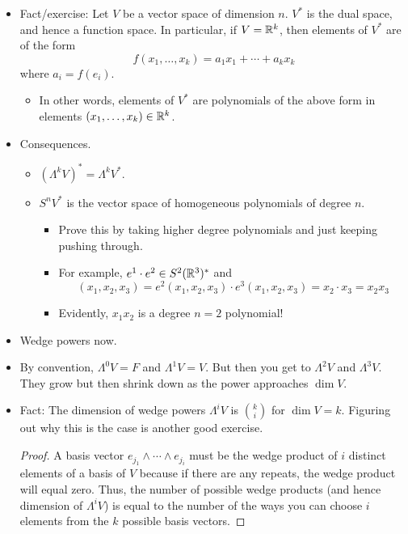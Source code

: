 \documentclass[../notes.tex]{subfiles}
\begin{document}
\begin{itemize}
\begin{itemize}
        \item Fact/exercise: Let $V$ be a vector space of dimension $n$. $V^*$ is the dual space, and hence a function space. In particular, if $V=\mathbb{R}^k$, then elements of $V^*$ are of the form
        \begin{equation*}
            f(x_1,\dots,x_k) = a_1x_1+\cdots+a_kx_k
        \end{equation*}
        where $a_i=f(e_i)$.
        \begin{itemize}
            \item In other words, elements of $V^*$ are polynomials of the above form in elements $(x_1,\dots,x_k)\in\mathbb{R}^k$.
        \end{itemize}
        \item Consequences.
        \begin{itemize}
            \item $(\Lambda^kV)^*=\Lambda^kV^*$.
            \item $S^nV^*$ is the vector space of homogeneous polynomials of degree $n$.
            \begin{itemize}
                \item Prove this by taking higher degree polynomials and just keeping pushing through.
                \item For example, $e^1\cdot e^2\in S^2(\mathbb{R}^3)^*$ and
                \begin{equation*}
                    [e^2\cdot e^3](x_1,x_2,x_3) = e^2(x_1,x_2,x_3)\cdot e^3(x_1,x_2,x_3) = x_2\cdot x_3 = x_2x_3
                \end{equation*}
                \item Evidently, $x_1x_2$ is a degree $n=2$ polynomial!
            \end{itemize}
        \end{itemize}
        \item Wedge powers now.
        \item By convention, $\Lambda^0V=F$ and $\Lambda^1V=V$. But then you get to $\Lambda^2V$ and $\Lambda^3V$. They grow but then shrink down as the power approaches $\dim V$.
        \item Fact: The dimension of wedge powers $\Lambda^iV$ is $\binom{k}{i}$ for $\dim V=k$. Figuring out why this is the case is another good exercise.
        \begin{proof}
            A basis vector $e_{j_1}\wedge\cdots\wedge e_{j_i}$ must be the wedge product of $i$ distinct elements of a basis of $V$ because if there are any repeats, the wedge product will equal zero. Thus, the number of possible wedge products (and hence dimension of $\Lambda^iV$) is equal to the number of the ways you can choose $i$ elements from the $k$ possible basis vectors.

\end{proof}
\end{itemize}
\end{itemize}
\end{document}
